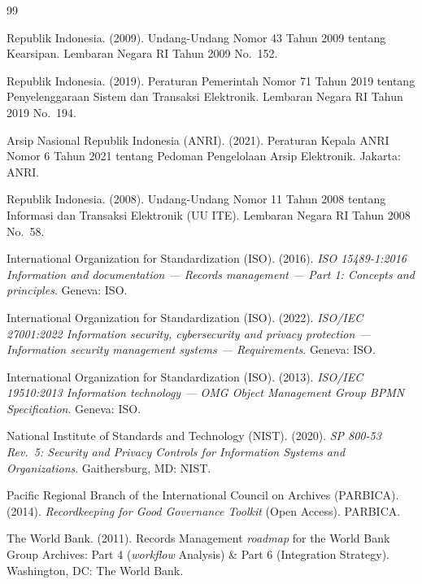\documentclass[12pt,a4paper]{report}
\begin{document}
\renewcommand{\bibname}{Daftar Pustaka}

\begin{thebibliography}{99}
\small

 Republik Indonesia. (2009). Undang-Undang Nomor 43 Tahun 2009 tentang Kearsipan. Lembaran Negara RI Tahun 2009 No.~152.

 Republik Indonesia. (2019). Peraturan Pemerintah Nomor 71 Tahun 2019 tentang Penyelenggaraan Sistem dan Transaksi Elektronik. Lembaran Negara RI Tahun 2019 No.~194.

 Arsip Nasional Republik Indonesia (ANRI). (2021). Peraturan Kepala ANRI Nomor 6 Tahun 2021 tentang Pedoman Pengelolaan Arsip Elektronik. Jakarta: ANRI.

 Republik Indonesia. (2008). Undang-Undang Nomor 11 Tahun 2008 tentang Informasi dan Transaksi Elektronik (UU ITE). Lembaran Negara RI Tahun 2008 No.~58.

 International Organization for Standardization (ISO). (2016). \textit{ISO 15489-1:2016 Information and documentation --- Records management --- Part 1: Concepts and principles}. Geneva: ISO.

 International Organization for Standardization (ISO). (2022). \textit{ISO/IEC 27001:2022 Information security, cybersecurity and privacy protection --- Information security management systems --- Requirements}. Geneva: ISO.

 International Organization for Standardization (ISO). (2013). \textit{ISO/IEC 19510:2013 Information technology --- OMG Object Management Group BPMN Specification}. Geneva: ISO.

 National Institute of Standards and Technology (NIST). (2020). \textit{SP 800-53 Rev.~5: Security and Privacy Controls for Information Systems and Organizations}. Gaithersburg, MD: NIST.

 Pacific Regional Branch of the International Council on Archives (PARBICA). (2014). \textit{Recordkeeping for Good Governance Toolkit} (Open Access). PARBICA.

 The World Bank. (2011). Records Management \textit{roadmap} for the World Bank Group Archives: Part 4 (\textit{workflow} Analysis) \& Part 6 (Integration Strategy). Washington, DC: The World Bank.


\end{thebibliography}
\end{document}
